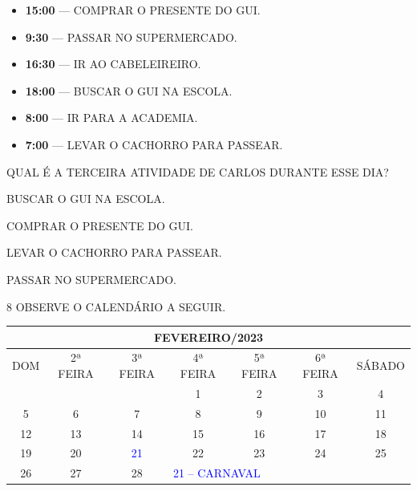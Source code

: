 \begin{myquote}
\begin{itemize}
  \item \textbf{15:00} --- \uppercase{Comprar o presente do Gui.}
  \item \textbf{9:30} --- \uppercase{Passar no supermercado.}
  \item \textbf{16:30} --- \uppercase{Ir ao cabeleireiro.}
  \item \textbf{18:00} --- \uppercase{Buscar o Gui na escola.}
  \item \textbf{8:00} --- \uppercase{Ir para a academia.}
  \item \textbf{7:00} --- \uppercase{Levar o cachorro para passear.}
\end{itemize}
\end{myquote}

QUAL É A TERCEIRA ATIVIDADE DE CARLOS DURANTE ESSE DIA?

\begin{escolha}[itemsep=-5pt]
\item BUSCAR O GUI NA ESCOLA.

\item COMPRAR O PRESENTE DO GUI.

\item LEVAR O CACHORRO PARA PASSEAR.

\item PASSAR NO SUPERMERCADO.
\end{escolha}

\num{8} OBSERVE O CALENDÁRIO A SEGUIR.\bigskip

\begin{table}[H]\footnotesize
\centering
\begin{tabular}{|ccccccc|}
\hline
\multicolumn{7}{|c|}{FEVEREIRO/2023} \\ \hline
\multicolumn{1}{|c|}{DOM} & \multicolumn{1}{c|}{2ª FEIRA} & \multicolumn{1}{c|}{3ª FEIRA} & \multicolumn{1}{c|}{4ª FEIRA} & \multicolumn{1}{c|}{5ª FEIRA} & \multicolumn{1}{c|}{6ª FEIRA} & SÁBADO \\ \hline
\multicolumn{1}{|c|}{} & \multicolumn{1}{c|}{} & \multicolumn{1}{c|}{} & \multicolumn{1}{c|}{1} & \multicolumn{1}{c|}{2} & \multicolumn{1}{c|}{3} & 4 \\ \hline
\multicolumn{1}{|c|}{5} & \multicolumn{1}{c|}{6} & \multicolumn{1}{c|}{7} & \multicolumn{1}{c|}{8} & \multicolumn{1}{c|}{9} & \multicolumn{1}{c|}{10} & 11 \\ \hline
\multicolumn{1}{|c|}{12} & \multicolumn{1}{c|}{13} & \multicolumn{1}{c|}{14} & \multicolumn{1}{c|}{15} & \multicolumn{1}{c|}{16} & \multicolumn{1}{c|}{17} & 18 \\ \hline
\multicolumn{1}{|c|}{19} & \multicolumn{1}{c|}{20} & \multicolumn{1}{c|}{\textcolor{blue}{21}} & \multicolumn{1}{c|}{22} & \multicolumn{1}{c|}{23} & \multicolumn{1}{c|}{24} & 25 \\ \hline
\multicolumn{1}{|c|}{26} & \multicolumn{1}{c|}{27} & \multicolumn{1}{c|}{28} & \multicolumn{4}{l|}{\textcolor{blue}{21 -- CARNAVAL}} \\ \hline
\end{tabular}\bigskip
\end{table}

